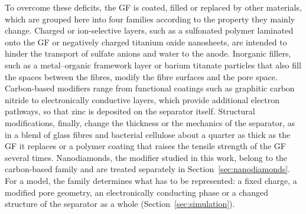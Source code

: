 To overcome these deficits, the GF is coated, filled or replaced by other materials, which are grouped here into four families according to the property they mainly change.
Charged or ion-selective layers, such as a sulfonated polymer laminated onto the GF\cite{sun_janus_2023} or negatively charged titanium oxide nanosheets\cite{tan_multiscale_2025}, are intended to hinder the transport of sulfate anions and water to the anode.
Inorganic fillers, such as a metal--organic framework layer\cite{shao_selfrecognition_2025} or barium titanate particles that also fill the spaces between the fibres\cite{liang_novel_2022}, modify the fibre surfaces and the pore space.
Carbon-based modifiers range from functional coatings such as graphitic carbon nitride\cite{luo_regulating_2024} to electronically conductive layers, which provide additional electron pathways, so that zinc is deposited on the separator itself\cite{lee_hydrophilic_2024}.
Structural modifications, finally, change the thickness or the mechanics of the separator, as in a blend of glass fibres and bacterial cellulose about a quarter as thick as the GF it replaces\cite{huang_bacterial_2025} or a polymer coating that raises the tensile strength of the GF several times\cite{kim_mechanically_2025}.
Nanodiamonds, the modifier studied in this work, belong to the carbon-based family and are treated separately in Section~\ref{sec:nanodiamonds}.
For a model, the family determines what has to be represented: a fixed charge, a modified pore geometry, an electronically conducting phase or a changed structure of the separator as a whole (Section~\ref{sec:simulation}).

